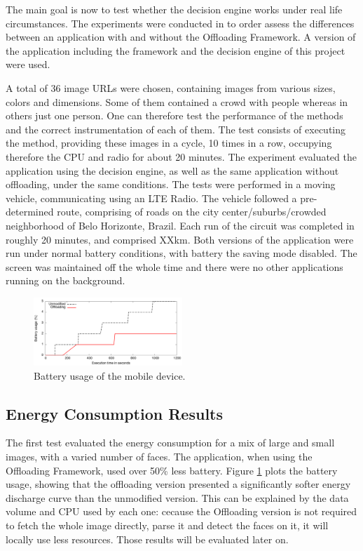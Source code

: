 \documentclass[10pt, conference, letterpaper]{IEEEtran}
\begin{document}
  The main goal is now to test whether the decision engine works under real life circumstances. The experiments were conducted in to order assess the differences between an application with and without the Offloading Framework. A version of the application including the framework and the decision engine of this project were used.

A total of 36 image URLs were chosen, containing images from various sizes, colors and dimensions. Some of them contained a crowd with people whereas in others just one person. One can therefore test the performance of the methods and the correct instrumentation of each of them. The test consists of executing the method, providing these images in a cycle, 10 times in a row, occupying therefore the CPU and radio for about 20 minutes. The experiment evaluated the application using the decision engine, as well as the same application without offloading, under the same conditions. The tests were performed in a moving vehicle, communicating using an LTE Radio. The vehicle followed a pre-determined route, comprising of roads on the {\color{red} city center/suburbs/crowded neighborhood} of Belo Horizonte, Brazil. {\color{red} Each run of the circuit was completed in roughly 20 minutes, and comprised XXkm}. Both versions of the application were run under normal battery conditions, with battery the saving mode disabled. The screen was maintained off the whole time and there were no other applications running on the background.

\begin{figure}[t]
  \centering
  \includegraphics[width=0.5\textwidth]{results/plots/executions.png}
  \caption{Battery usage of the mobile device.}
  \label{fig:batteryusage}
\end{figure}

  \subsection{Energy Consumption Results}

The first test evaluated the energy consumption for a mix of large and small images, with a varied number of faces. The application, when using the Offloading Framework, used over 50\% less battery. Figure \ref{fig:batteryusage} plots the battery usage, showing that the offloading version presented a significantly softer energy discharge curve than the unmodified version. This can be explained by the data volume and CPU used by each one: cecause the Offloading version is not required to fetch the whole image directly, parse it and detect the faces on it, it will locally use less resources. Those results will be evaluated later on.
\end{document}
